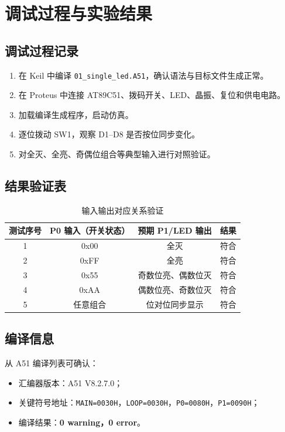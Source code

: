 \section{调试过程与实验结果}

\subsection{调试过程记录}
\begin{enumerate}
  \item 在 Keil 中编译 \texttt{01\_single\_led.A51}，确认语法与目标文件生成正常。
  \item 在 Proteus 中连接 AT89C51、拨码开关、LED、晶振、复位和供电电路。
  \item 加载编译生成程序，启动仿真。
  \item 逐位拨动 SW1，观察 D1--D8 是否按位同步变化。
  \item 对全灭、全亮、奇偶位组合等典型输入进行对照验证。
\end{enumerate}

\subsection{结果验证表}
\begin{table}[H]
  \centering
  \caption{输入输出对应关系验证}
  \renewcommand{\arraystretch}{1.35}
  \begin{tabular}{cccc}
    \toprule
    测试序号 & P0 输入（开关状态） & 预期 P1/LED 输出 & 结果 \\
    \midrule
    1 & 0x00 & 全灭 & 符合 \\
    2 & 0xFF & 全亮 & 符合 \\
    3 & 0x55 & 奇数位亮、偶数位灭 & 符合 \\
    4 & 0xAA & 偶数位亮、奇数位灭 & 符合 \\
    5 & 任意组合 & 位对位同步显示 & 符合 \\
    \bottomrule
  \end{tabular}
\end{table}

\subsection{编译信息}
从 A51 编译列表可确认：
\begin{itemize}
  \item 汇编器版本：A51 V8.2.7.0；
  \item 关键符号地址：\texttt{MAIN=0030H}，\texttt{LOOP=0030H}，\texttt{P0=0080H}，\texttt{P1=0090H}；
  \item 编译结果：\textbf{0 warning，0 error}。
\end{itemize}

